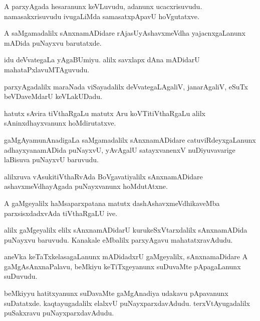 \documentclass{article}
\begin{document}
\begin{mn}
A parxyAgada hesaranunx keVLuvudu, adanunx ucacxrisuvudu. namasakxrisuvudu ivugaLiMda 
samasatxpApavU hoVgutatxve.
\end{mn}

\begin{mn}
A saMgamadalilx sAnxnamADidare rAjasUyAshavxmeVdha yajacnxgaLanunx mADida puNayxvu barutatxde.
\end{mn}

\begin{mn}
idu deVvategaLa yAgaBUmiyu. alilx savxlapx dAna mADidarU mahataPxlavuMTAguvudu.
\end{mn}

\begin{mn}
parxyAgadalilx maraNada viSayadalilx deVvategaLAgaliV, janarAgaliV, eSuTx beVDaveMdarU keVLakUDadu.
\end{mn}

\begin{mn}
hatutx sAvira tiVthaRgaLu matutx  Aru koVTitiVthaRgaLu alilx sAninxdhayxvanunx hoMdirutatxve.
\end{mn}

\begin{mn}
gaMgAyamunAnadigaLa saMgamadalilx sAnxnamADidare catuviRdeyxgaLanunx adhayxyanamADida puNayxvU, 
yAvAgalU satayxvanenxV nuDiyuvavarige laBisuva puNayxvU baruvudu.
\end{mn}

\begin{mn}
alilxruva vAsukitiVthaRvAda BoVgavatiyalilx sAnxnamADidare ashavxmeVdhayAgada puNayxvanunx 
hoMdutAtxne.
\end{mn}

\begin{mn}
A gaMgeyalilx haMsaparxpatana matutx dashAshavxmeVdhikaveMba parxsisxdadxvAda tiVthaRgaLU ive.
\end{mn}

\begin{mn}
alilx gaMgeyalilx elilx sAnxnamADidarU kurukeSxVtarxdalilx sAnxnamADida puNayxvu baruvudu. 
Kanakale eMbalilx parxyAgavu mahatatxravAdudu.
\end{mn}

\begin{mn}
aneVka keTaTxkelasagaLanunx mADidadxrU gaMgeyalilx, sAnxnamaDidare A gaMgAsAnxnaPalavu, beMkiyu
keTiTxgeyanunx suDuvaMte pApagaLanunx suDuvudu.
\end{mn}

\begin{mn}
beMkiyyu hatitxyanunx suDavaMte gaMgAnadiya udakavu pApavanunx suDatatxde. kaqtayugadalilx elalxvU
puNayxparxdavAdudu. terxVtAyugadalilx puSakxravu puNayxparxdavAdudu.
\end{mn}
\end{document}
